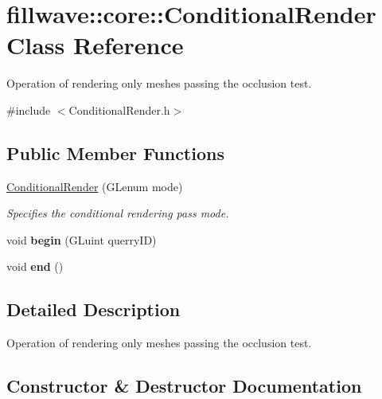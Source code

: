 \hypertarget{classfillwave_1_1core_1_1ConditionalRender}{}\section{fillwave\+:\+:core\+:\+:Conditional\+Render Class Reference}
\label{classfillwave_1_1core_1_1ConditionalRender}


Operation of rendering only meshes passing the occlusion test.  




{\ttfamily \#include $<$Conditional\+Render.\+h$>$}

\subsection*{Public Member Functions}
\begin{DoxyCompactItemize}
\item 
\hyperlink{classfillwave_1_1core_1_1ConditionalRender_a405d055bd9b4d4833976f0a906af9df6}{Conditional\+Render} (G\+Lenum mode)
\begin{DoxyCompactList}\small\item\em Specifies the conditional rendering pass mode. \end{DoxyCompactList}\item 
\hypertarget{classfillwave_1_1core_1_1ConditionalRender_a892c070d065d80eb66396a6090b01a3c}{}void {\bfseries begin} (G\+Luint querry\+I\+D)\label{classfillwave_1_1core_1_1ConditionalRender_a892c070d065d80eb66396a6090b01a3c}

\item 
\hypertarget{classfillwave_1_1core_1_1ConditionalRender_ab3cd5b2fd6cbcb2953c93bc10d04cd6d}{}void {\bfseries end} ()\label{classfillwave_1_1core_1_1ConditionalRender_ab3cd5b2fd6cbcb2953c93bc10d04cd6d}

\end{DoxyCompactItemize}


\subsection{Detailed Description}
Operation of rendering only meshes passing the occlusion test. 

\subsection{Constructor \& Destructor Documentation}
\hypertarget{classfillwave_1_1core_1_1ConditionalRender_a405d055bd9b4d4833976f0a906af9df6}{}
